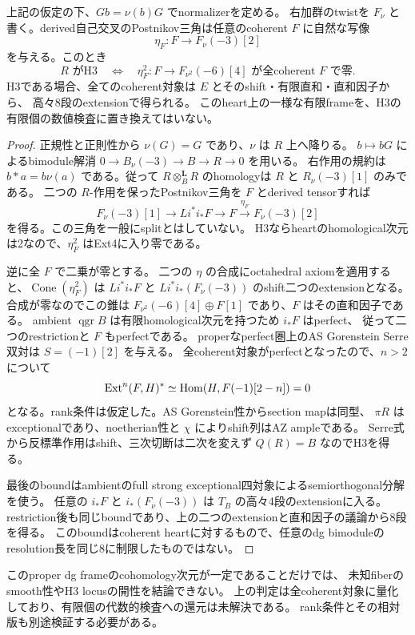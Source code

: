 \begin{theorem}[hypersurface作用のheart上の二乗による判定]\label{thm:eta-square-H3}
上記の仮定の下、$Gb=\nu(b)G$ でnormalizerを定める。
右加群のtwistを $F_\nu$ と書く。derived自己交叉のPostnikov三角は任意のcoherent $F$ に自然な写像
\[
 \eta_F:F\longrightarrow F_\nu(-3)[2]
\]
を与える。このとき
\[
 R\text{ がH3}\quad\Longleftrightarrow\quad
 \eta_F^2:F\longrightarrow F_{\nu^2}(-6)[4]\text{ が全coherent }F\text{ で零}.
\]
H3である場合、全てのcoherent対象は $E$ とそのshift・有限直和・直和因子から、
高々8段のextensionで得られる。
このheart上の一様な有限frameを、H3の有限個の数値検査に置き換えてはいない。
\end{theorem}
\begin{proof}
正規性と正則性から $\nu(G)=G$ であり、$\nu$ は $R$ 上へ降りる。
$b\mapsto bG$ によるbimodule解消
$0\to B_\nu(-3)\to B\to R\to0$ を用いる。
右作用の規約は $b*a=b\nu(a)$ である。従って
$R\otimes_B^{\mathbf L}R$ のhomologyは $R$ と $R_\nu(-3)[1]$ のみである。
二つの $R$-作用を保ったPostnikov三角を $F$ とderived tensorすれば
\[
 F_\nu(-3)[1]\longrightarrow Li^*i_*F\longrightarrow F
        \xrightarrow{\eta_F}F_\nu(-3)[2]
\]
を得る。この三角を一般にsplitとはしていない。
H3ならheartのhomological次元は2なので、$\eta_F^2$ はExt4に入り零である。

逆に全 $F$ で二乗が零とする。
二つの $\eta$ の合成にoctahedral axiomを適用すると、$\operatorname{Cone}(\eta_F^2)$ は
$Li^*i_*F$ と $Li^*i_*(F_\nu(-3))$ のshift二つのextensionとなる。
合成が零なのでこの錐は $F_{\nu^2}(-6)[4]\oplus F[1]$ であり、$F$ はその直和因子である。
ambient $\operatorname{qgr}B$ は有限homological次元を持つため $i_*F$ はperfect、
従って二つのrestrictionと $F$ もperfectである。
properなperfect圏上のAS Gorenstein Serre双対は
$S=(-1)[2]$ を与える。
全coherent対象がperfectとなったので、$n>2$ について
\[
 \operatorname{Ext}^n(F,H)^*\simeq\operatorname{Hom}(H,F(-1)[2-n])=0
\]
となる。rank条件は仮定した。AS Gorenstein性からsection mapは同型、
$\pi R$ はexceptionalであり、noetherian性と $\chi$ によりshift列はAZ ampleである。
Serre式から反標準作用はshift、三次切断は二次を変えず $Q(R)=B$ なのでH3を得る。

最後のboundはambientのfull strong exceptional四対象によるsemiorthogonal分解を使う。
任意の $i_*F$ と $i_*(F_\nu(-3))$ は $T_B$ の高々4段のextensionに入る。
restriction後も同じboundであり、上の二つのextensionと直和因子の議論から8段を得る。
このboundはcoherent heartに対するもので、任意のdg bimoduleのresolution長を同じ8に制限したものではない。
\end{proof}

\begin{remark}[残る有限判定問題]
このproper dg frameのcohomology次元が一定であることだけでは、
未知fiberのsmooth性やH3 locusの開性を結論できない。
上の判定は全coherent対象に量化しており、有限個の代数的検査への還元は未解決である。
rank条件とその相対版も別途検証する必要がある。
\end{remark}
